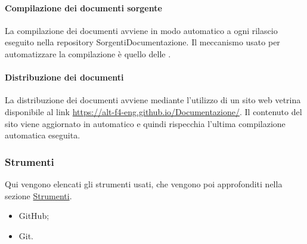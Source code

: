 \paragraph{Compilazione dei documenti sorgente}
La compilazione dei documenti avviene in modo automatico a ogni rilascio eseguito nella repository SorgentiDocumentazione.
Il meccanismo usato per automatizzare la compilazione è quello delle .


\paragraph{Distribuzione dei documenti}
La distribuzione dei documenti avviene mediante l'utilizzo di un sito web vetrina disponibile al link \href{https://alt-f4-eng.github.io/Documentazione/}{https://alt-f4-eng.github.io/Documentazione/}.
Il contenuto del sito viene aggiornato in automatico e quindi rispecchia l'ultima compilazione automatica eseguita. 

\subsubsection{Strumenti}
Qui vengono elencati gli strumenti usati, che vengono poi approfonditi nella sezione \hyperref[sec:strumenti]{Strumenti}.
\begin{itemize}
    \item GitHub;
    \item Git.
\end{itemize}

